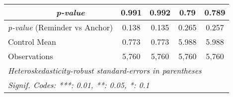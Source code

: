 \begin{tabular}{cccccc}
\multicolumn{1}{l}{} & \multicolumn{1}{c}{\scriptsize{\textit{p-value}}} & \multicolumn{1}{c}{0.991} & \multicolumn{1}{c}{0.992} & \multicolumn{1}{c}{0.79} & \multicolumn{1}{c}{0.789} \\
\midrule
\multicolumn{2}{l}{\textit{p-value} (Reminder vs Anchor)}& \multicolumn{1}{c}{0.138}& \multicolumn{1}{c}{0.135}& \multicolumn{1}{c}{0.265}& \multicolumn{1}{c}{0.257}\\
\multicolumn{2}{l}{Control Mean} &0.773&0.773&5.988&5.988\\
\multicolumn{2}{l}{Observations} &5,760&5,760&5,760&5,760\\
\midrule
\midrule \midrule
\multicolumn{6}{l}{\emph{Heteroskedasticity-robust standard-errors in parentheses}}\\
\multicolumn{6}{l}{\emph{Signif. Codes: ***: 0.01, **: 0.05, *: 0.1}}\\

\end{tabular}

